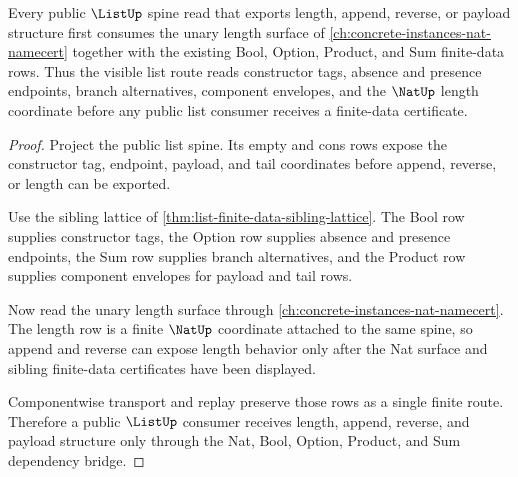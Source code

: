\begin{theorem}
\label{thm:list-nat-finite-data-dependency-bridge}
Every public $\ListUp$ spine read that exports length, append, reverse, or payload structure first consumes the unary length surface of \autoref{ch:concrete-instances-nat-namecert} together with the existing Bool, Option, Product, and Sum finite-data rows. Thus the visible list route reads constructor tags, absence and presence endpoints, branch alternatives, component envelopes, and the $\NatUp$ length coordinate before any public list consumer receives a finite-data certificate.
\end{theorem}
\begin{proof}
Project the public list spine. Its empty and cons rows expose the constructor tag, endpoint, payload, and tail coordinates before append, reverse, or length can be exported.

Use the sibling lattice of \autoref{thm:list-finite-data-sibling-lattice}. The Bool row supplies constructor tags, the Option row supplies absence and presence endpoints, the Sum row supplies branch alternatives, and the Product row supplies component envelopes for payload and tail rows.

Now read the unary length surface through \autoref{ch:concrete-instances-nat-namecert}. The length row is a finite $\NatUp$ coordinate attached to the same spine, so append and reverse can expose length behavior only after the Nat surface and sibling finite-data certificates have been displayed.

Componentwise transport and replay preserve those rows as a single finite route. Therefore a public $\ListUp$ consumer receives length, append, reverse, and payload structure only through the Nat, Bool, Option, Product, and Sum dependency bridge.
\end{proof}
